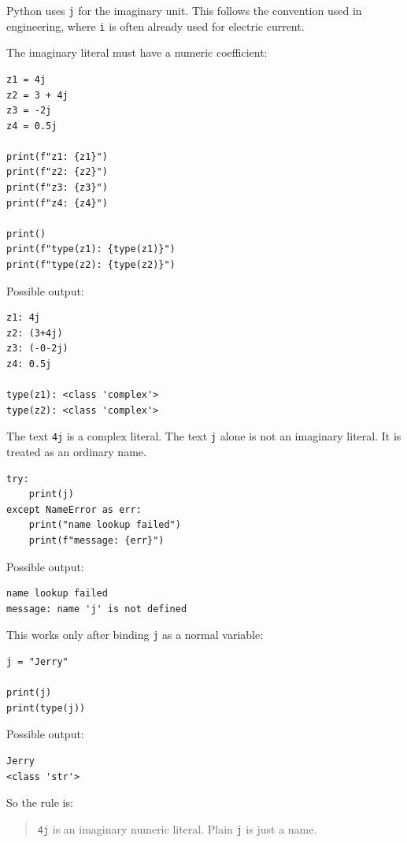 Python uses \texttt{j} for the imaginary unit. This follows the convention used in engineering, where \texttt{i} is often already used for electric current.

The imaginary literal must have a numeric coefficient:

\begin{verbatim}
z1 = 4j
z2 = 3 + 4j
z3 = -2j
z4 = 0.5j

print(f"z1: {z1}")
print(f"z2: {z2}")
print(f"z3: {z3}")
print(f"z4: {z4}")

print()
print(f"type(z1): {type(z1)}")
print(f"type(z2): {type(z2)}")
\end{verbatim}

Possible output:

\begin{verbatim}
z1: 4j
z2: (3+4j)
z3: (-0-2j)
z4: 0.5j

type(z1): <class 'complex'>
type(z2): <class 'complex'>
\end{verbatim}

The text \texttt{4j} is a complex literal. The text \texttt{j} alone is not an imaginary literal. It is treated as an ordinary name.

\begin{verbatim}
try:
    print(j)
except NameError as err:
    print("name lookup failed")
    print(f"message: {err}")
\end{verbatim}

Possible output:

\begin{verbatim}
name lookup failed
message: name 'j' is not defined
\end{verbatim}

This works only after binding \texttt{j} as a normal variable:

\begin{verbatim}
j = "Jerry"

print(j)
print(type(j))
\end{verbatim}

Possible output:

\begin{verbatim}
Jerry
<class 'str'>
\end{verbatim}

So the rule is:

\begin{quote}
\texttt{4j} is an imaginary numeric literal. Plain \texttt{j} is just a name.
\end{quote}

